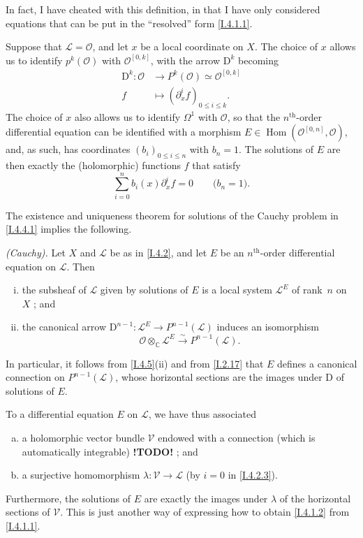 \documentclass{report}
\theoremstyle{plain}
\newenvironment{theorem}[1]
    {\renewcommand\theinnercustomtheorem{#1}\innercustomtheorem}
    {\endinnercustomlemma}
\theoremstyle{definition}
\newenvironment{env}[1]
    {\renewcommand\theinnercustomenv{#1}\innercustomenv}
    {\endinnercustomenv}
\newcommand{\sh}[1]{{\mathscr{#1}}}
\newcommand{\CC}{\mathbb{C}}
\newcommand{\DD}{\mathrm{D}}
\renewcommand{\leq}{\leqslant}
\DeclareMathOperator{\Hom}{Hom}
\newcommand{\todo}{\textbf{ !TODO! }}
\newcommand{\oldpage}[1]{\marginpar{\footnotesize$\Big\vert$ \textit{p.~#1}}}
\begin{document}
In fact, I have cheated with this definition, in that I have only considered equations that can be put in the ``resolved'' form \cref{I.4.1.1}.

\oldpage{25}
\begin{env}{4.4}
\label{I.4.4}
  Suppose that $\sh{L}=\sh{O}$, and let $x$ be a local coordinate on $X$.
  The choice of $x$ allows us to identify $p^k(\sh{O})$ with $\sh{O}^{[0,k]}$, with the arrow $\DD^k$ becoming
  \[
    \begin{aligned}
      \DD^k\colon \sh{O} &\to P^k(\sh{O}) \simeq \sh{O}^{[0,k]}
    \\f &\mapsto (\partial_x^i f)_{0\leq i\leq k}.
    \end{aligned}
  \]
  The choice of $x$ also allows us to identify $\Omega^1$ with $\sh{O}$, so that the $n^\mathrm{th}$-order differential equation can be identified with a morphism $E\in\Hom(\sh{O}^{[0,n]},\sh{O})$, and, as such, has coordinates $(b_i)_{0\leq i\leq n}$ with $b_n=1$.
  The solutions of $E$ are then exactly the (holomorphic) functions $f$ that satisfy
  \[
  \label{I.4.4.1}
    \sum_{i=0}^n b_i(x) \partial_x^i f = 0
    \qquad\mbox{($b_n=1$).}
  \tag{4.4.1}
  \]

  The existence and uniqueness theorem for solutions of the Cauchy problem in \cref{I.4.4.1} implies the following.
\end{env}

\begin{theorem}{4.5}
\label{I.4.5}
  \emph{(Cauchy).}
  Let $X$ and $\sh{L}$ be as in \cref{I.4.2}, and let $E$ be an $n^\mathrm{th}$-order differential equation on $\sh{L}$.
  Then
  \begin{enumerate}[(i)]
    \item the subsheaf of $\sh{L}$ given by solutions of $E$ is a local system $\sh{L}^E$ of rank~$n$ on $X$ ; and
    \item the canonical arrow $\DD^{n-1}\colon\sh{L}^E \to P^{n-1}(\sh{L})$ induces an isomorphism
      \[
        \sh{O}\otimes_\CC\sh{L}^E \xrightarrow{\sim} P^{n-1}(\sh{L}).
      \]
  \end{enumerate}
\end{theorem}

In particular, it follows from \cref{I.4.5}(ii) and from \cref{I.2.17} that $E$ defines a canonical connection on $P^{n-1}(\sh{L})$, whose horizontal sections are the images under $\DD$ of solutions of $E$.

\begin{env}{4.6}
\label{I.4.6}
  To a differential equation $E$ on $\sh{L}$, we have thus associated
  \begin{enumerate}[a)]
    \item a holomorphic vector bundle $\sh{V}$ endowed with a connection (which is automatically integrable) \todo ; and
    \item a surjective homomorphism $\lambda\colon\sh{V}\to\sh{L}$ (by $i=0$ in \cref{I.4.2.3}).
  \end{enumerate}
  Furthermore, the solutions of $E$ are exactly the images under $\lambda$ of the horizontal sections of $\sh{V}$.
  This is just another way of expressing how to obtain \cref{I.4.1.2} from \cref{I.4.1.1}.
\end{env}
\end{document}
